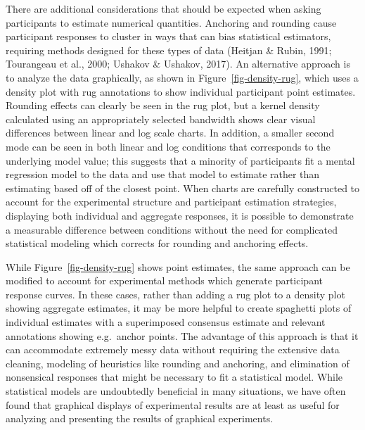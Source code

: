 \documentclass[
  10pt,
]{article}
\begin{document}
There are additional considerations that should be expected when asking
participants to estimate numerical quantities. Anchoring and rounding
cause participant responses to cluster in ways that can bias statistical
estimators, requiring methods designed for these types of data (Heitjan
\& Rubin, 1991; Tourangeau et al., 2000; Ushakov \& Ushakov, 2017). An
alternative approach is to analyze the data graphically, as shown in
Figure~\ref{fig-density-rug}, which uses a density plot with rug
annotations to show individual participant point estimates. Rounding
effects can clearly be seen in the rug plot, but a kernel density
calculated using an appropriately selected bandwidth shows clear visual
differences between linear and log scale charts. In addition, a smaller
second mode can be seen in both linear and log conditions that
corresponds to the underlying model value; this suggests that a minority
of participants fit a mental regression model to the data and use that
model to estimate rather than estimating based off of the closest point.
When charts are carefully constructed to account for the experimental
structure and participant estimation strategies, displaying both
individual and aggregate responses, it is possible to demonstrate a
measurable difference between conditions without the need for
complicated statistical modeling which corrects for rounding and
anchoring effects.

While Figure~\ref{fig-density-rug} shows point estimates, the same
approach can be modified to account for experimental methods which
generate participant response curves. In these cases, rather than adding
a rug plot to a density plot showing aggregate estimates, it may be more
helpful to create spaghetti plots of individual estimates with a
superimposed consensus estimate and relevant annotations showing
e.g.~anchor points. The advantage of this approach is that it can
accommodate extremely messy data without requiring the extensive data
cleaning, modeling of heuristics like rounding and anchoring, and
elimination of nonsensical responses that might be necessary to fit a
statistical model. While statistical models are undoubtedly beneficial
in many situations, we have often found that graphical displays of
experimental results are at least as useful for analyzing and presenting
the results of graphical experiments.
\end{document}
